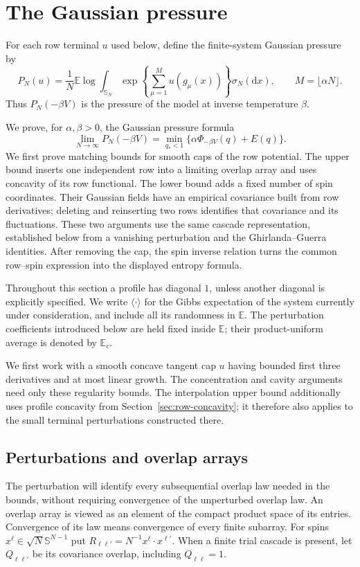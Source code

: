 \documentclass[11pt,a4paper]{article}
\numberwithin{equation}{section}
\theoremstyle{definition}
\theoremstyle{remark}
\newcommand{\E}{\mathbb E}
\newcommand{\dd}{\mathrm d}
\begin{document}
\section{The Gaussian pressure}\label{sec:gaussian-pressure}

For each row terminal $u$ used below, define the finite-system Gaussian
pressure by
\[
 P_N(u)=\frac1N\E\log\int_{\mathbb S_N}
       \exp\left\{\sum_{\mu=1}^{M}u(g_\mu(x))\right\}\sigma_N(\dd x),
 \qquad M=\lfloor\alpha N\rfloor.
\]
Thus $P_N(-\beta V)$ is the pressure of the model at inverse temperature
$\beta$.

We prove, for $\alpha,\beta>0$, the Gaussian pressure formula
\[
 \lim_{N\to\infty}P_N(-\beta V)
 =\min_{q_*<1}\{\alpha\Phi_{-\beta V}(q)+E(q)\}.
\]
We first prove matching bounds for smooth caps of the row potential.
The upper bound inserts one independent row into a limiting overlap array
and uses concavity of its row functional. The lower bound adds a fixed
number of spin coordinates. Their Gaussian fields have an empirical
covariance built from row derivatives; deleting and reinserting two rows
identifies that covariance and its fluctuations. These two arguments use
the same cascade representation, established below from a vanishing
perturbation and the Ghirlanda--Guerra identities. After removing the cap,
the spin inverse relation turns the common row--spin expression into the
displayed entropy formula.

Throughout this section a profile has diagonal $1$, unless another diagonal is
explicitly specified. We write $\langle\cdot\rangle$ for the Gibbs expectation
of the system currently under consideration, and include all its randomness
in $\E$. The perturbation coefficients introduced below are held fixed inside
$\E$; their product-uniform average is denoted by $\E_c$.

We first work with a smooth concave tangent cap $u$ having bounded first three
derivatives and at most linear growth. The concentration and cavity arguments
need only these regularity bounds. The interpolation upper bound additionally
uses profile concavity from Section~\ref{sec:row-concavity}; it therefore also
applies to the small terminal perturbations constructed there.

\subsection{Perturbations and overlap arrays}

The perturbation will identify every subsequential overlap law needed in
the bounds, without requiring convergence of the unperturbed overlap law.
An overlap array is viewed as an element of the compact product space of its
entries. Convergence of its law means convergence of every finite subarray.
For spins $x^\ell\in\sqrt N\mathbb S^{N-1}$ put
$R_{\ell\ell'}=N^{-1}x^\ell\cdot x^{\ell'}$. When a finite trial cascade is
present, let $Q_{\ell\ell'}$ be its covariance overlap, including
$Q_{\ell\ell}=1$.
\end{document}
